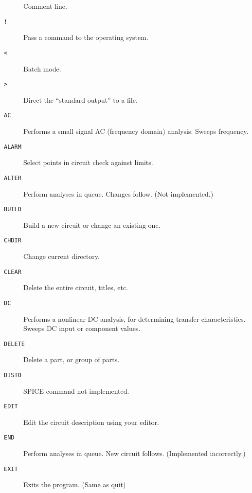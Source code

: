 
\begin{description}

\item[{\tt *}] Comment line.

\item[{\tt !}] Pass a command to the operating system.

\item[{\tt <}] Batch mode.

\item[{\tt >}] Direct the ``standard output'' to a file.

\item[{\tt AC}] Performs a small signal AC (frequency domain) analysis.
Sweeps frequency.

\item[{\tt ALARM}] Select points in circuit check against limits.

\item[{\tt ALTER}] Perform analyses in queue.  Changes follow.  (Not
implemented.)

\item[{\tt BUILD}] Build a new circuit or change an existing one.

\item[{\tt CHDIR}] Change current directory.

\item[{\tt CLEAR}] Delete the entire circuit, titles, etc.

\item[{\tt DC}] Performs a nonlinear DC analysis, for determining transfer
characteristics.  Sweeps DC input or component values.

\item[{\tt DELETE}] Delete a part, or group of parts.

\item[{\tt DISTO}] SPICE command not implemented.

\item[{\tt EDIT}] Edit the circuit description using your editor.

\item[{\tt END}] Perform analyses in queue.  New circuit follows.
(Implemented incorrectly.)

\item[{\tt EXIT}] Exits the program.  (Same as quit)


\end{description}
